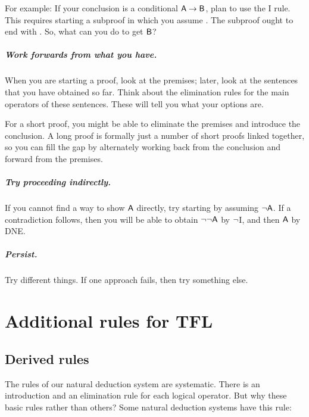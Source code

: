 For example: If your conclusion is a conditional $\mathsf{A}\rightarrow\mathsf{B}$, plan to use the {\eif}I rule. This requires starting a subproof in which you assume . The subproof ought to end with . So, what can you do to get $\mathsf{B}$?

\paragraph{Work forwards from what you have.}
When you are starting a proof, look at the premises; later, look at the sentences that you have obtained so far. Think about the elimination rules for the main operators of these sentences. These will tell you what your options are.

For a short proof, you might be able to eliminate the premises and introduce the conclusion. A long proof is formally just a number of short proofs linked together, so you can fill the gap by alternately working back from the conclusion and forward from the premises.

\paragraph{Try proceeding indirectly.}
If you cannot find a way to show $\mathsf{A}$ directly, try starting by assuming ${\neg} \mathsf{A}$. If a contradiction follows, then you will be able to obtain ${\neg} {\neg} \mathsf{A}$ by ${\neg}$I, and then $\mathsf{A}$ by DNE.  

\paragraph{Persist.}
Try different things. If one approach fails, then try something else.



\chapter{Additional rules for TFL}\label{s:Further}

\section{Derived rules}
The rules of our natural deduction system are systematic. There is an introduction and an elimination rule for each logical operator. But why these basic rules rather than others? Some natural deduction systems have this rule:

